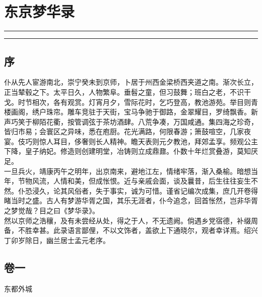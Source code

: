 \documentclass[]{article}
\date{}
\begin{document}
\hypertarget{header-n0}{%
\section{东京梦华录}\label{header-n0}}

\begin{center}\rule{0.5\linewidth}{\linethickness}\end{center}

\tableofcontents

\begin{center}\rule{0.5\linewidth}{\linethickness}\end{center}

\hypertarget{header-n7}{%
\subsection{序}\label{header-n7}}

仆从先人宦游南北，崇宁癸未到京师，卜居于州西金梁桥西夹道之南。渐次长立，正当辇毂之下。太平日久，人物繁阜。垂髫之童，但习鼓舞；班白之老，不识干戈。时节相次，各有观赏。灯宵月夕，雪际花时，乞巧登高，教池游苑。举目则青楼画阁，绣户珠帘。雕车竞驻于天街，宝马争驰于御路，金翠耀目，罗绮飘香。新声巧笑于柳陌花衢，按管调弦于茶坊酒肆。八荒争凑，万国咸通。集四海之珍奇，皆归市易；会寰区之异味，悉在庖厨。花光满路，何限春游；箫鼓喧空，几家夜宴。伎巧则惊人耳目，侈奢则长人精神。瞻天表则元夕教池，拜郊孟享。频观公主下降，皇子纳妃。修造则创建明堂，冶铸则立成鼎鼐。仆数十年烂赏叠游，莫知厌足。\\
一旦兵火，靖康丙午之明年，出京南来，避地江左，情绪牢落，渐入桑榆。暗想当年，节物风流，人情和美，但成怅恨。近与亲戚会面，谈及曩昔，后生往往妄生不然。仆恐浸久，论其风俗者，失于事实，诚为可惜。谨省记编次成集，庶几开卷得睹当时之盛。古人有梦游华胥之国，其乐无涯者，仆今追念，回首怅然，岂非华胥之梦觉哉？目之曰《梦华录》。\\
然以京师之浩穰，及有未尝经从处，得之于人，不无遗阙。倘遇乡党宿德，补缀周备，不胜幸甚。此录语言鄙俚，不以文饰者，盖欲上下通晓尔，观者幸详焉。绍兴丁卯岁除日，幽兰居士孟元老序。

\hypertarget{header-n10}{%
\subsection{卷一}\label{header-n10}}

东都外城
\end{document}
